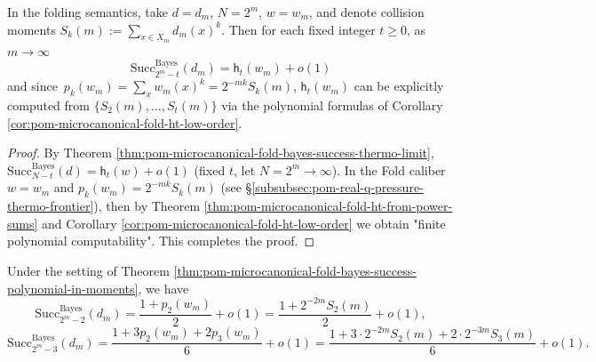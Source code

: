 \begin{theorem}\label{thm:pom-microcanonical-fold-bayes-success-polynomial-in-moments}
In the folding semantics, take \(d=d_m\), \(N=2^m\), \(w=w_m\), and denote collision moments
\(
S_k(m):=\sum_{x\in X_m}d_m(x)^k
\).
Then for each fixed integer \(t\ge 0\), as \(m\to\infty\)
\[
\boxed{\;
\mathrm{Succ}^{\mathrm{Bayes}}_{2^m-t}(d_m)=\mathsf{h}_t(w_m)+o(1)\;}
\]
and since \(\,p_k(w_m)=\sum_x w_m(x)^k=2^{-mk}S_k(m)\), \(\mathsf{h}_t(w_m)\) can be explicitly computed from
\(\{S_2(m),\dots,S_t(m)\}\) via the polynomial formulas of Corollary \ref{cor:pom-microcanonical-fold-ht-low-order}.
\end{theorem}
\begin{proof}
By Theorem \ref{thm:pom-microcanonical-fold-bayes-success-thermo-limit},
\(
\mathrm{Succ}^{\mathrm{Bayes}}_{N-t}(d)=\mathsf{h}_t(w)+o(1)
\)
(fixed \(t\), let \(N=2^m\to\infty\)).
In the Fold caliber \(w=w_m\) and \(p_k(w_m)=2^{-mk}S_k(m)\) (see \S\ref{subsubsec:pom-real-q-pressure-thermo-frontier}), then by Theorem \ref{thm:pom-microcanonical-fold-ht-from-power-sums} and Corollary \ref{cor:pom-microcanonical-fold-ht-low-order} we obtain "finite polynomial computability". This completes the proof.
\end{proof}

\begin{corollary}\label{cor:pom-microcanonical-fold-bayes-success-examples-t2-t3}
Under the setting of Theorem \ref{thm:pom-microcanonical-fold-bayes-success-polynomial-in-moments}, we have
\[
\mathrm{Succ}^{\mathrm{Bayes}}_{2^m-2}(d_m)
=\frac{1+p_2(w_m)}{2}+o(1)
=\frac{1+2^{-2m}S_2(m)}{2}+o(1),
\]
\[
\mathrm{Succ}^{\mathrm{Bayes}}_{2^m-3}(d_m)
=\frac{1+3p_2(w_m)+2p_3(w_m)}{6}+o(1)
=\frac{1+3\cdot 2^{-2m}S_2(m)+2\cdot 2^{-3m}S_3(m)}{6}+o(1).
\]
\end{corollary}

